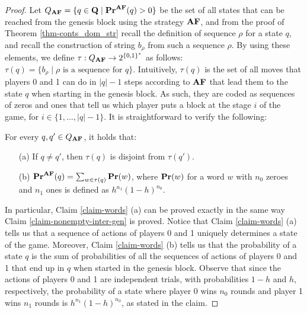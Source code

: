 \begin{proof}
Let $Q_{\text{\rm {\bf AF}}} = \{q \in \mathbf{Q} \mid \mathbf{Pr}^{\text{\rm {\bf AF}}}(q) > 0\}$ be the set of all states that can be reached from the genesis block using the strategy $\text{\rm {\bf AF}}$, and from the proof of Theorem \ref{thm-conts_dom_str} recall the definition of sequence $\rho$ for a state $q$, and recall the construction of string $b_\rho$ from such a sequence $\rho$.
By using these elements, we define $\tau:Q_{\text{\rm {\bf AF}}} \to 2^{\{0,1\}^*}$ as follows:
$\tau(q) = \{ b_\rho \mid \rho \text{ is a sequence for } q\}$.
Intuitively, $\tau(q)$ is the set of all moves that players 0 and 1 can do in $|q|-1$ steps according to $\text{\rm {\bf AF}}$ that lead them to the state $q$ when starting in the genesis block. As such, they are coded as sequences of zeros and ones that tell us which player puts a block at the stage $i$ of the game, for $i \in \{ 1,\ldots, |q|-1\}$. It is straightforward to verify the following:
\begin{myclaim}\label{claim-words} For every $q, q'\in Q_{\text{\rm {\bf AF}}}$, it holds that:
\begin{itemize}
\item[(a)] If $q\neq q'$, then $\tau(q)$ is disjoint from $\tau(q')$.
\item[(b)] $\mathbf{Pr}^{\text{\rm {\bf AF}}}(q) = \sum_{w \in \tau(q)} \mathbf{Pr}(w)$, where $\mathbf{Pr}(w)$ for a word $w$ with $n_0$ zeroes and $n_1$ ones is  defined as 
$h^{n_1}(1-h)^{n_0}$.
\end{itemize}
\end{myclaim}
In particular, Claim \ref{claim-words} (a) can be proved exactly in the same way Claim \ref{claim-nonempty-inter-gen} is proved. Notice that Claim \ref{claim-words} (a)
tells us that a sequence of actions of players 0 and 1 uniquely determines a state of the game. 
Moreover,  Claim \ref{claim-words} (b)
tells us that the probability of a state $q$ is the sum of probabilities of all the sequences of actions of players 0 and 1 that end up in $q$ when started in the genesis block. Observe that since the actions of players 0 and 1 are independent trials, with  probabilities $1-h$ and $h$, respectively, the probability of a state where player 0 wins $n_0$ rounds and player 1 wins $n_1$ rounds is $h^{n_1}(1-h)^{n_0}$, as stated in the claim.



\end{proof}
